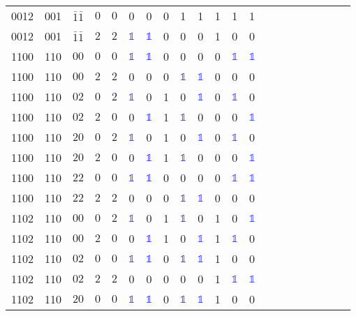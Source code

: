 \begin{longtable*}{c| cccccccccccccccccccc }
0012& 001& $\bar{1}\bar{1}$& $0$& $0$& 0& 0& 0& 1& 1& 1& 1& 1\\
0012& 001& $\bar{1}\bar{1}$& $2$& $2$& \textcolor{blue}{$\mathds{1}$}& \textcolor{blue}{$\mathds{1}$}& 0& 0& 0& 1& 0& 0\\
1100& 110& $00$& $0$& $0$& \textcolor{blue}{$\mathds{1}$}& \textcolor{blue}{$\mathds{1}$}& 0& 0& 0& 0& \textcolor{blue}{$\mathds{1}$}& \textcolor{blue}{$\mathds{1}$}\\
1100& 110& $00$& $2$& $2$& 0& 0& 0& \textcolor{blue}{$\mathds{1}$}& \textcolor{blue}{$\mathds{1}$}& 0& 0& 0\\
1100& 110& $02$& $0$& $2$& \textcolor{blue}{$\mathds{1}$}& 0& 1& 0& \textcolor{blue}{$\mathds{1}$}& 0& \textcolor{blue}{$\mathds{1}$}& 0\\
1100& 110& $02$& $2$& $0$& 0& \textcolor{blue}{$\mathds{1}$}& 1& \textcolor{blue}{$\mathds{1}$}& 0& 0& 0& \textcolor{blue}{$\mathds{1}$}\\
1100& 110& $20$& $0$& $2$& \textcolor{blue}{$\mathds{1}$}& 0& 1& 0& \textcolor{blue}{$\mathds{1}$}& 0& \textcolor{blue}{$\mathds{1}$}& 0\\
1100& 110& $20$& $2$& $0$& 0& \textcolor{blue}{$\mathds{1}$}& 1& \textcolor{blue}{$\mathds{1}$}& 0& 0& 0& \textcolor{blue}{$\mathds{1}$}\\
1100& 110& $22$& $0$& $0$& \textcolor{blue}{$\mathds{1}$}& \textcolor{blue}{$\mathds{1}$}& 0& 0& 0& 0& \textcolor{blue}{$\mathds{1}$}& \textcolor{blue}{$\mathds{1}$}\\
1100& 110& $22$& $2$& $2$& 0& 0& 0& \textcolor{blue}{$\mathds{1}$}& \textcolor{blue}{$\mathds{1}$}& 0& 0& 0\\
1102& 110& $00$& $0$& $2$& \textcolor{blue}{$\mathds{1}$}& 0& 1& \textcolor{blue}{$\mathds{1}$}& 0& 1& 0& \textcolor{blue}{$\mathds{1}$}\\
1102& 110& $00$& $2$& $0$& 0& \textcolor{blue}{$\mathds{1}$}& 1& 0& \textcolor{blue}{$\mathds{1}$}& 1& \textcolor{blue}{$\mathds{1}$}& 0\\
1102& 110& $02$& $0$& $0$& \textcolor{blue}{$\mathds{1}$}& \textcolor{blue}{$\mathds{1}$}& 0& \textcolor{blue}{$\mathds{1}$}& \textcolor{blue}{$\mathds{1}$}& 1& 0& 0\\
1102& 110& $02$& $2$& $2$& 0& 0& 0& 0& 0& 1& \textcolor{blue}{$\mathds{1}$}& \textcolor{blue}{$\mathds{1}$}\\
1102& 110& $20$& $0$& $0$& \textcolor{blue}{$\mathds{1}$}& \textcolor{blue}{$\mathds{1}$}& 0& \textcolor{blue}{$\mathds{1}$}& \textcolor{blue}{$\mathds{1}$}& 1& 0& 0\\

\end{longtable*}

